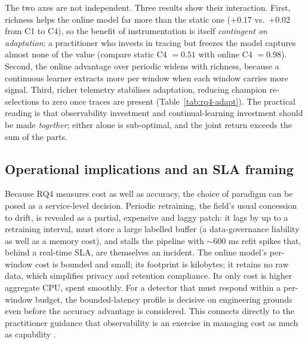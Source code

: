 \documentclass[acmsmall]{acmart}
\begin{document}
The two axes are not independent. Three results show their interaction. First, richness helps the online model far more than the static one ($+0.17$ vs.\ $+0.02$ from C1 to C4), so the benefit of instrumentation is itself \emph{contingent on adaptation}: a practitioner who invests in tracing but freezes the model captures almost none of the value (compare static C4 $=0.51$ with online C4 $=0.98$). Second, the online advantage over periodic widens with richness, because a continuous learner extracts more per window when each window carries more signal. Third, richer telemetry stabilises adaptation, reducing champion re-selections to zero once traces are present (Table~\ref{tab:rq4-adapt}). The practical reading is that observability investment and continual-learning investment should be made \emph{together}; either alone is sub-optimal, and the joint return exceeds the sum of the parts.

\subsection{Operational implications and an SLA framing}\label{sec:disc-ops}

Because RQ4 measures cost as well as accuracy, the choice of paradigm can be posed as a service-level decision. Periodic retraining, the field's usual concession to drift, is revealed as a partial, expensive and laggy patch: it lags by up to a retraining interval, must store a large labelled buffer (a data-governance liability as well as a memory cost), and stalls the pipeline with $\sim 600$ ms refit spikes that, behind a real-time SLA, are themselves an incident. The online model's per-window cost is bounded and small; its footprint is kilobytes; it retains no raw data, which simplifies privacy and retention compliance. Its only cost is higher aggregate CPU, spent smoothly. For a detector that must respond within a per-window budget, the bounded-latency profile is decisive on engineering grounds even before the accuracy advantage is considered. This connects directly to the practitioner guidance that observability is an exercise in managing cost as much as capability \cite{leadingobs,aws2022obs}.
\end{document}
